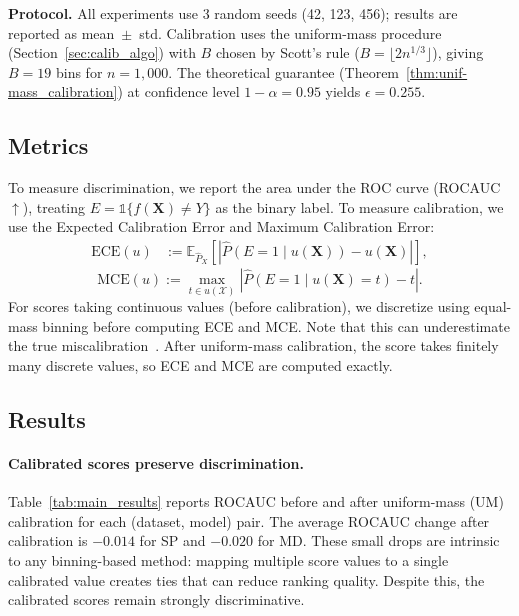 \documentclass{article}
\theoremstyle{plain}
\theoremstyle{definition}
\theoremstyle{remark}
\begin{document}
\textbf{Protocol.}
All experiments use 3 random seeds (42, 123, 456); results are reported as mean~$\pm$~std.
Calibration uses the uniform-mass procedure (Section~\ref{sec:calib_algo}) with $B$ chosen by Scott’s rule ($B = \lfloor 2 n^{1/3} \rfloor$), giving $B=19$ bins for $n=1{,}000$.
The theoretical guarantee (Theorem~\ref{thm:unif-mass_calibration}) at confidence level $1-\alpha = 0.95$ yields $\epsilon = 0.255$.

\subsection{Metrics}

To measure discrimination, we report the area under the ROC curve (ROCAUC~$\uparrow$), treating $E = \mathds{1}\{f(\mathbf{X}) \neq Y\}$ as the binary label.
To measure calibration, we use the Expected Calibration Error and Maximum Calibration Error:
\begin{align*}
    \mathrm{ECE}(u)
&:= \mathbb{E}_{\hat P_X}\!\left[\left|\hat P\!\left(E=1 \mid u(\mathbf X)\right) - u(\mathbf X)\right|\right],
\end{align*}
\[
\mathrm{MCE}(u)
:= \max_{t \in u(\mathcal{X})}
\left|\hat P\!\left(E=1 \mid u(\mathbf X)=t\right) - t\right|.
\]
For scores taking continuous values (before calibration), we discretize using equal-mass binning before computing ECE and MCE.
Note that this can underestimate the true miscalibration~\citep{kumar_verified_2020}.
After uniform-mass calibration, the score takes finitely many discrete values, so ECE and MCE are computed exactly.

\subsection{Results}



\paragraph{Calibrated scores preserve discrimination.}
Table~\ref{tab:main_results} reports ROCAUC before and after uniform-mass (UM) calibration for each (dataset, model) pair.
The average ROCAUC change after calibration is $-0.014$ for SP and $-0.020$ for MD.
These small drops are intrinsic to any binning-based method: mapping multiple score values to a single calibrated value creates ties that can reduce ranking quality.
Despite this, the calibrated scores remain strongly discriminative.
\end{document}
